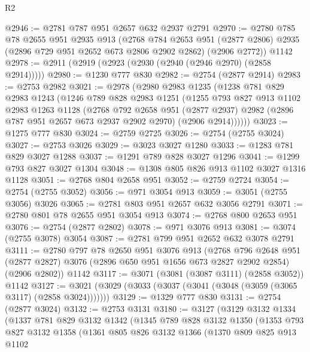 \begin{lexlean}{R2}
\begin{coremodule}
@2946 := @2781 @787 @951 @2657 @632 @2937 @2791
@2970 := @2780
    @785
    @78
    @2655
    @951
    @2935
    @913
    (@2768
      @784
      @2653
      @951
      (@2877 @2806)
      @2935
      (@2896 @729 @951 @2652 @673 @2806 @2902 @2862)
      (@2906 @2772))
    @1142
@2978 := @2911 (@2919 (@2923 (@2930 (@2940 (@2946 @2970) (@2858 @2914)))))
@2980 := @1230 @777 @830
@2982 := @2754 (@2877 @2914)
@2983 := @2753 @2982
@3021 := @2978
    (@2980
      @2983
      @1235
      (@1238
        @781
        @829
        @2983
        @1243
        (@1246
          @789
          @828
          @2983
          @1251
          (@1255
            @793
            @827
            @913
            @1102
            @2983
            @1263
            @1128
            (@2768
              @792
              @2658
              @951
              (@2877 @2937)
              @2982
              (@2896 @787 @951 @2657 @673 @2937 @2902 @2970)
              (@2906 @2914))))))
@3023 := @1275 @777 @830
@3024 := @2759 @2725
@3026 := @2754 (@2755 @3024)
@3027 := @2753 @3026
@3029 := @3023 @3027 @1280
@3033 := @1283 @781 @829 @3027 @1288
@3037 := @1291 @789 @828 @3027 @1296
@3041 := @1299 @793 @827 @3027 @1304
@3048 := @1308 @805 @826 @913 @1102 @3027 @1316 @1128
@3051 := @2768 @804 @2658 @951
@3052 := @2759 @2724
@3054 := @2754 (@2755 @3052)
@3056 := @971 @3054 @913
@3059 := @3051 (@2755 @3056) @3026
@3065 := @2781 @803 @951 @2657 @632 @3056 @2791
@3071 := @2780 @801 @78 @2655 @951 @3054 @913
@3074 := @2768 @800 @2653 @951
@3076 := @2754 (@2877 @2802)
@3078 := @971 @3076 @913
@3081 := @3074 (@2755 @3078) @3054
@3087 := @2781 @799 @951 @2652 @632 @3078 @2791
@3111 := @2780
    @797
    @78
    @2650
    @951
    @3076
    @913
    (@2768
      @796
      @2648
      @951
      (@2877 @2827)
      @3076
      (@2896 @650 @951 @1656 @673 @2827 @2902 @2854)
      (@2906 @2802))
    @1142
@3117 := @3071 (@3081 (@3087 @3111) (@2858 @3052)) @1142
@3127 := @3021 (@3029 (@3033 (@3037 (@3041 (@3048 (@3059 (@3065 @3117) (@2858 @3024)))))))
@3129 := @1329 @777 @830
@3131 := @2754 (@2877 @3024)
@3132 := @2753 @3131
@3180 := @3127
    (@3129
      @3132
      @1334
      (@1337
        @781
        @829
        @3132
        @1342
        (@1345
          @789
          @828
          @3132
          @1350
          (@1353
            @793
            @827
            @3132
            @1358
            (@1361
              @805
              @826
              @3132
              @1366
              (@1370
                @809
                @825
                @913
                @1102

\end{coremodule}
\end{lexlean}
